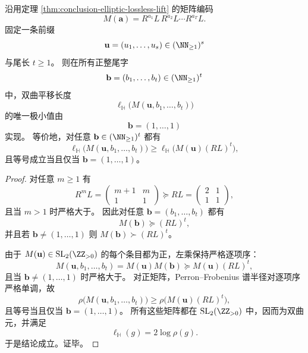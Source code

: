 \begin{theorem}[固定前缀下的黄金尾唯一极小性]\label{thm:conclusion-prefix-conditioned-golden-tail-minimality}
沿用定理 \ref{thm:conclusion-elliptic-lossless-lift} 的矩阵编码
\[
M(\mathbf a)=R^{a_1}L\,R^{a_2}L\cdots R^{a_T}L.
\]
固定一条前缀
\[
\mathbf u=(u_1,\dots,u_s)\in(\NN_{\ge 1})^s
\]
与尾长 \(t\ge 1\)。
则在所有正整尾字
\[
\mathbf b=(b_1,\dots,b_t)\in(\NN_{\ge 1})^t
\]
中，双曲平移长度
\[
\ell_{\mathbb H}\!\bigl(M(\mathbf u,b_1,\dots,b_t)\bigr)
\]
的唯一极小值由
\[
\mathbf b=(1,\dots,1)
\]
实现。
等价地，对任意 \(\mathbf b\in(\NN_{\ge 1})^t\) 都有
\[
\ell_{\mathbb H}\!\bigl(M(\mathbf u,b_1,\dots,b_t)\bigr)
\ge
\ell_{\mathbb H}\!\bigl(M(\mathbf u)(RL)^t\bigr),
\]
且等号成立当且仅当 \(\mathbf b=(1,\dots,1)\)。
\end{theorem}
\begin{proof}
对任意 \(m\ge 1\) 有
\[
R^mL=
\begin{pmatrix}
m+1&m\\
1&1
\end{pmatrix}
\succeq
RL=
\begin{pmatrix}
2&1\\
1&1
\end{pmatrix},
\]
且当 \(m>1\) 时严格大于。
因此对任意 \(\mathbf b=(b_1,\dots,b_t)\) 都有
\[
M(\mathbf b)\succeq (RL)^t,
\]
并且若 \(\mathbf b\neq (1,\dots,1)\) 则 \(M(\mathbf b)\succ (RL)^t\)。

由于 \(M(\mathbf u)\in \mathrm{SL}_2(\ZZ_{>0})\) 的每个条目都为正，左乘保持严格逐项序：
\[
M(\mathbf u,b_1,\dots,b_t)=M(\mathbf u)M(\mathbf b)\succeq M(\mathbf u)(RL)^t,
\]
且当 \(\mathbf b\neq (1,\dots,1)\) 时严格大于。
对正矩阵，Perron--Frobenius 谱半径对逐项序严格单调，故
\[
\rho\!\bigl(M(\mathbf u,b_1,\dots,b_t)\bigr)
\ge
\rho\!\bigl(M(\mathbf u)(RL)^t\bigr),
\]
且等号当且仅当 \(\mathbf b=(1,\dots,1)\)。
所有这些矩阵都在 \(\mathrm{SL}_2(\ZZ_{>0})\) 中，因而为双曲元，并满足
\[
\ell_{\mathbb H}(g)=2\log \rho(g).
\]
于是结论成立。证毕。
\end{proof}

